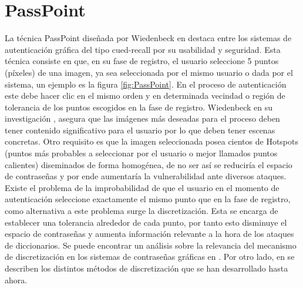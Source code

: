 \documentclass[12pt]{report}
\begin{document}
\section{PassPoint}
	La técnica PassPoint diseñada por Wiedenbeck en \cite{1} destaca entre los sistemas de autenticación gráfica del tipo cued-recall por su usabilidad y seguridad.
	Esta técnica consiste en que, en su fase de registro, el
	usuario seleccione 5 puntos (píxeles) de una imagen, ya sea seleccionada por el mismo usuario o dada por el sistema, un ejemplo es la figura \ref{fig:PassPoint}. En el proceso de autenticación este debe hacer clic en el mismo orden y en determinada  vecindad o región de tolerancia de los puntos escogidos en la fase de registro.
	Wiedenbeck en su investigación \cite{1}, asegura que las imágenes más deseadas para el proceso deben tener contenido significativo para el usuario por lo que deben tener escenas concretas. Otro requisito es que la imagen seleccionada posea cientos de Hotspots (puntos más probables a seleccionar por el usuario o mejor llamados puntos calientes) diseminados de forma homogénea, de no ser así se reduciría el espacio de contraseñas y por ende aumentaría la vulnerabilidad ante diversos ataques. Existe el problema de la improbabilidad de que el usuario en el momento de autenticación  seleccione exactamente el mismo punto que en la fase de registro, como alternativa a este problema surge la discretización. Esta se encarga de establecer una tolerancia alrededor de cada punto, por tanto esto disminuye el espacio de contraseñas y aumenta información relevante a la hora de los ataques de diccionarios. Se puede encontrar un análisis sobre la relevancia del mecanismo de discretización en los sistemas de contraseñas gráficas en \cite{14,15,16}. Por otro lado, en \cite{14,15,16,17} se describen los distintos métodos de discretización que se han desarrollado hasta ahora.

	
\end{document}
